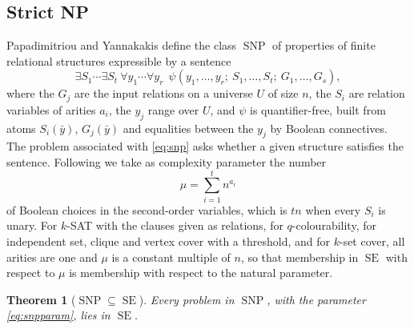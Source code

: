 \documentclass[11pt,reqno]{amsart}
\numberwithin{equation}{section}
\theoremstyle{plain}
\newtheorem{theorem}{Theorem}[section]
\theoremstyle{definition}
\theoremstyle{remark}
\DeclareMathOperator{\SE}{SE}
\DeclareMathOperator{\SNP}{SNP}
\begin{document}
\subsection{Strict NP}
Papadimitriou and Yannakakis \cite{PY91} define the class $\SNP$ of properties
of finite relational structures expressible by a sentence
\begin{equation}\label{eq:snp}
  \exists S_1\cdots\exists S_t\ \forall y_1\cdots\forall y_r\ \ \psi(y_1,\dots,y_r;\ S_1,\dots,S_t;\ G_1,\dots,G_s),
\end{equation}
where the $G_j$ are the input relations on a universe $U$ of size $n$, the
$S_i$ are relation variables of arities $a_i$, the $y_j$ range over $U$, and
$\psi$ is quantifier-free, built from atoms $S_i(\bar y)$, $G_j(\bar y)$ and
equalities between the $y_j$ by Boolean connectives. The problem associated
with \eqref{eq:snp} asks whether a given structure satisfies the sentence.
Following \cite{IPZ01} we take as complexity parameter the number
\begin{equation}\label{eq:snpparam}
  \mu=\sum_{i=1}^{t}n^{a_i}
\end{equation}
of Boolean choices in the second-order variables, which is $tn$ when every
$S_i$ is unary. For $k$-SAT with the clauses given as relations, for
$q$-colourability, for independent set, clique and vertex cover with a
threshold, and for $k$-set cover, all arities are one and $\mu$ is a constant
multiple of $n$, so that membership in $\SE$ with respect to $\mu$ is
membership with respect to the natural parameter.

\begin{theorem}[$\SNP\subseteq\SE$]\label{thm:snp}
Every problem in $\SNP$, with the parameter \eqref{eq:snpparam}, lies in $\SE$.
\end{theorem}
\end{document}
